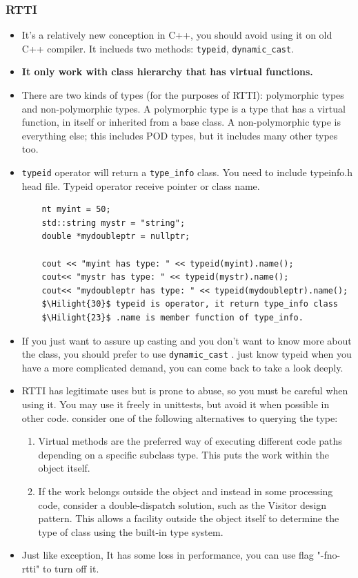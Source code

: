 \documentclass[a4paper,11pt,twoside]{book}
\newcommand{\Hilight}[1]{\makebox[0pt][l]{\color{yellow}\rule[-3pt]{#1em}{11pt}}}
\newcommand{\Hilight}[1]{}
\begin{document}
\subsubsection{RTTI}
\begin{itemize}
	\item It's a relatively new conception in C++, you should avoid using it on old C++ compiler. It inclueds two methods: \texttt{typeid}, \texttt{dynamic\_cast}.
	\item \textbf{It only work with class hierarchy that has virtual functions. }
	
	\item There are two kinds of types (for the purposes of RTTI): polymorphic types and non-polymorphic types. A polymorphic type is a type that has a virtual function, in itself or inherited from a base class. A non-polymorphic type is everything else; this includes POD types, but it includes many other types too.
	
	\item \texttt{typeid} operator will return a \texttt{type\_info} class.  You need to include typeinfo.h head file. Typeid operator receive pointer or class name.
	
	\begin{lstlisting}
	nt myint = 50;
	std::string mystr = "string";
	double *mydoubleptr = nullptr;
	
	cout << "myint has type: " << typeid(myint).name();
	cout<< "mystr has type: " << typeid(mystr).name();
	cout<< "mydoubleptr has type: " << typeid(mydoubleptr).name();
	$\Hilight{30}$ typeid is operator, it return type_info class
	$\Hilight{23}$ .name is member function of type_info.
	\end{lstlisting}
	
	\item If you just want to assure up casting and you don't want to know more about the class, you should prefer to use \texttt{dynamic\_cast} . just know typeid when you have a more complicated demand, you can come back to take a look deeply.
	
	\item RTTI has legitimate uses but is prone to abuse, so you must be careful when using it. You may use it freely in unittests, but avoid it when possible in other code. consider one of the following alternatives to querying the type:
	\begin{enumerate}
		\item Virtual methods are the preferred way of executing different code paths depending on a specific subclass type. This puts the work within the object itself.
		\item If the work belongs outside the object and instead in some processing code, consider a double-dispatch solution, such as the Visitor design pattern. This allows a facility outside the object itself to determine the type of class using the built-in type system.
	\end{enumerate}
	
	\item Just like exception, It has some loss in performance, you can use flag "-fno-rtti" to turn off it.
\end{itemize}
\end{document}

